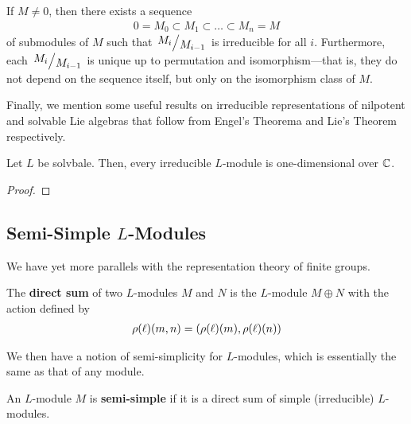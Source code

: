 \begin{boxtheorem}\label{Ch2:Thm:JordanHolder}
    If $M \neq 0$, then there exists a sequence
    \begin{align}
        0 = M_0 \subset M_1 \subset \ldots \subset M_n = M
    \end{align}
    of submodules of $M$ such that $\quotient{M_i}{M_{i-1}}$ is irreducible for all $i$. Furthermore, each $\quotient{M_i}{M_{i-1}}$ is unique up to permutation and isomorphism---that is, they do not depend on the sequence itself, but only on the isomorphism class of $M$.
\end{boxtheorem}

Finally, we mention some useful results on irreducible representations of nilpotent and solvable Lie algebras that follow from Engel's Theorema and Lie's Theorem respectively.

\begin{boxproposition}
    Let $L$ be solvbale. Then, every irreducible $L$-module is one-dimensional over $\mathbb{C}$.
\end{boxproposition}
\begin{proof}
    \sorry 
\end{proof}



\subsection{Semi-Simple $L$-Modules}

We have yet more parallels with the representation theory of finite groups.

\begin{boxdefinition}\label{Ch2:Def:ModuleDirectSum}
    The \textbf{direct sum} of two $L$-modules $M$ and $N$ is the $L$-module $M \oplus N$ with the action defined by
    \begin{align}
        \rho(\ell)(m, n) = \left( \rho(\ell)(m), \rho(\ell)(n) \right)
    \end{align}
\end{boxdefinition}

We then have a notion of semi-simplicity for $L$-modules, which is essentially the same as that of any module.

\begin{boxdefinition}\label{Ch2:Def:SemiSimpleModule}
    An $L$-module $M$ is \textbf{semi-simple} if it is a direct sum of simple (irreducible) $L$-modules.
\end{boxdefinition}

